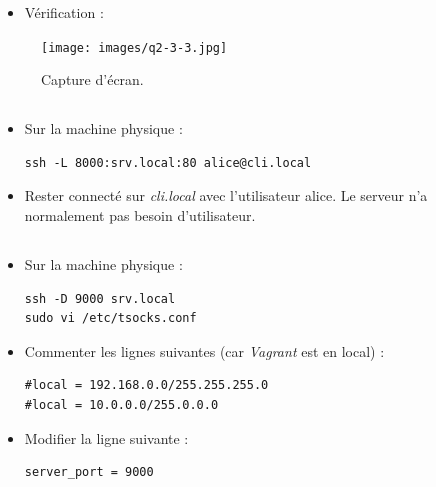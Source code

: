 \documentclass{article}
\begin{document}
\begin{itemize}
    \item Vérification :
\end{itemize}

\begin{figure}[h]
\centering
\texttt{[image: images/q2-3-3.jpg]}
\caption{\label{fig:frog}Capture d'écran.}
\end{figure}

\subsection{}

\begin{itemize}
\item Sur la machine physique :
\begin{lstlisting}
ssh -L 8000:srv.local:80 alice@cli.local
\end{lstlisting}
\item Rester connecté sur \emph{cli.local} avec l’utilisateur alice. Le serveur n’a normalement pas besoin d’utilisateur.
\end{itemize}

\subsection{}

\begin{itemize}
\item Sur la machine physique :
\begin{lstlisting}
ssh -D 9000 srv.local
sudo vi /etc/tsocks.conf
\end{lstlisting}
\item Commenter les lignes suivantes (car \emph{Vagrant} est en local) :
\begin{lstlisting}
#local = 192.168.0.0/255.255.255.0
#local = 10.0.0.0/255.0.0.0
\end{lstlisting}
\item Modifier la ligne suivante :
\begin{lstlisting}
server_port = 9000
\end{lstlisting}
\end{itemize}

\subsection{}
\end{document}
